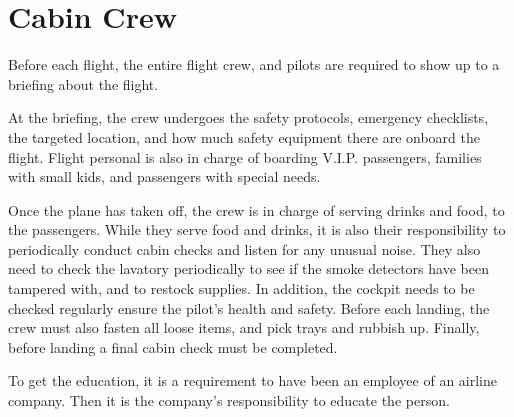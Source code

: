 \section{Cabin Crew}
Before each flight, the entire flight crew, and pilots are required to show up to a briefing about the flight.

At the briefing, the crew undergoes the safety protocols, emergency checklists, the targeted location, and how much safety equipment there are onboard the flight. Flight personal is also in charge of boarding V.I.P. passengers, families with small kids, and passengers with special needs.

Once the plane has taken off, the crew is in charge of serving drinks and food, to the passengers. While they serve food and drinks, it is also their responsibility to periodically conduct cabin checks and listen for any unusual noise. They also need to check the lavatory periodically to see if the smoke detectors have been tampered with, and to restock supplies. In addition, the cockpit needs to be checked regularly ensure the pilot's health and safety. Before each landing, the crew must also fasten all loose items, and pick trays and rubbish up. Finally, before landing a final cabin check must be completed.

To get the education, it is a requirement to have been an employee of an airline company. Then it is the company’s responsibility to educate the person. 

